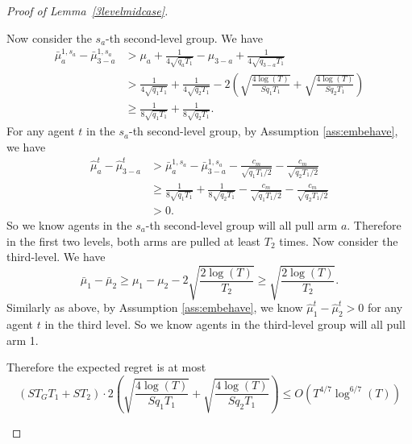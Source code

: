 \begin{proof}[Proof of Lemma~\ref{3levelmidcase}]
\begin{itemize}
Now consider the $s_a$-th second-level group. We have
\begin{align*}
\bar{\mu}_a^{1,s_a} - \bar{\mu}_{3-a}^{1,s_a} &> \mu_a + \frac{1}{4\sqrt{q_aT_1}} -\mu_{3-a} +\frac{1}{4\sqrt{q_{3-a}T_1}} \\
&> \frac{1}{4\sqrt{q_1T_1}}+ \frac{1}{4\sqrt{q_2T_1}} - 2\left(\sqrt{\frac{4\log(T)}{Sq_1T_1}} 
+ \sqrt{\frac{4\log(T)}{Sq_2T_1}}\right) \\
&\geq \frac{1}{8\sqrt{q_1T_1}}+ \frac{1}{8\sqrt{q_2T_1}}.
\end{align*}
For any agent $t$ in the $s_a$-th second-level group, by Assumption \ref{ass:embehave}, we have
\begin{align*}
\hat{\mu}_a^t - \hat{\mu}_{3-a}^t &>\bar{\mu}_a^{1,s_a} - \bar{\mu}_{3-a}^{1,s_a} - \frac{c_m}{\sqrt{q_1T_1/2}} - \frac{c_m}{\sqrt{q_2T_1/2}}\\
&\geq   \frac{1}{8\sqrt{q_1T_1}}+ \frac{1}{8\sqrt{q_2T_1}}- \frac{c_m}{\sqrt{q_1T_1/2}} - \frac{c_m}{\sqrt{q_2T_1/2}}\\
 &> 0.
\end{align*}
So we know agents in the $s_a$-th second-level group will all pull arm $a$. Therefore in the first two levels, both arms are pulled at least $T_2$ times. Now consider the third-level. We have
\[
\bar{\mu}_1 - \bar{\mu}_2  \geq \mu_1 -\mu_2 - 2\sqrt{\frac{2\log(T)}{T_2}} \geq \sqrt{\frac{2\log(T)}{T_2}}.
\]
Similarly as above, by Assumption \ref{ass:embehave}, we know $\hat{\mu}_1^t - \hat{\mu}_2^t > 0$ for any agent $t$ in the third level. So we know agents in the third-level group will all pull arm 1.

Therefore the expected regret is at most 
\[
(S T_G T_1 + S T_2) \cdot 2\left(\sqrt{\frac{4\log(T)}{Sq_1T_1}} 
+ \sqrt{\frac{4\log(T)}{Sq_2T_1}}\right) \leq O(T^{4/7} \log^{6/7}(T))
\]

\end{itemize}





\end{proof}